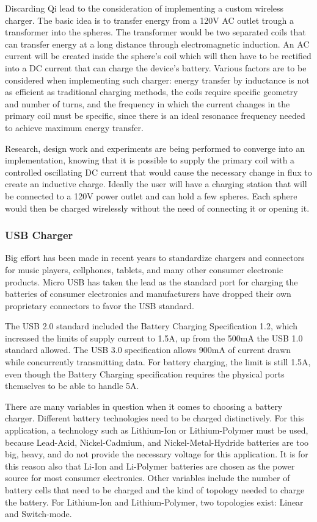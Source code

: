 Discarding Qi lead to the consideration of implementing a custom wireless charger. The basic idea is to transfer energy from a 120V AC outlet trough a transformer into the spheres. The transformer would be two separated coils that can transfer energy at a long distance through electromagnetic induction. An AC current will be created inside the sphere's coil which will then have to be rectified into a DC current that can charge the device's battery. Various factors are to be considered when implementing such charger: energy transfer by inductance is not as efficient as traditional charging methods, the coils require specific geometry and number of turns, and the frequency in which the current changes in the primary coil must be specific, since there is an ideal resonance frequency needed to achieve maximum energy transfer. 

Research, design work and experiments are being performed to converge into an implementation, knowing that it is possible to supply the primary coil with a controlled oscillating DC current that would cause the necessary change in flux to create an inductive charge. Ideally the user will have a charging station that will be connected to a 120V power outlet and can hold a few spheres. Each sphere would then be charged wirelessly without the need of connecting it or opening it.

\subsubsection{USB Charger}
Big effort has been made in recent years to standardize chargers and connectors for music players, cellphones, tablets, and many other consumer electronic products. Micro USB has taken the lead as the standard port for charging the batteries of consumer electronics and manufacturers have dropped their own proprietary connectors to favor the USB standard.

The USB 2.0 standard included the Battery Charging Specification 1.2, which increased the limits of supply current to 1.5A, up from the 500mA the USB 1.0 standard allowed. The USB 3.0 specification allows 900mA of current drawn while concurrently transmitting data. For battery charging, the limit is still 1.5A, even though the Battery Charging specification requires the physical ports themselves to be able to handle 5A.

There are many variables in question when it comes to choosing a battery charger. Different battery technologies need to be charged distinctively. For this application, a technology such as Lithium-Ion or Lithium-Polymer must be used, because Lead-Acid, Nickel-Cadmium, and Nickel-Metal-Hydride batteries are too big, heavy, and do not provide the necessary voltage for this application. It is for this reason also that Li-Ion and Li-Polymer batteries are chosen as the power source for most consumer electronics. Other variables include the number of battery cells that need to be charged and the kind of topology needed to charge the battery. For Lithium-Ion and Lithium-Polymer, two topologies exist: Linear and Switch-mode.

